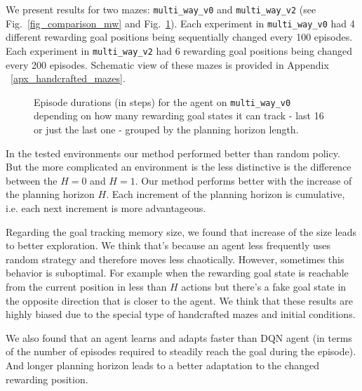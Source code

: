 \documentclass[a4paper,twoside]{article}
\begin{document}
We present results for two mazes: \texttt{multi\_way\_v0} and \texttt{multi\_way\_v2} (see Fig.~\ref{fig_comparison_mw} and Fig.~\ref{fig_detailed_mw0}). Each experiment in \texttt{multi\_way\_v0} had 4 different rewarding goal positions being sequentially changed every 100 episodes. Each experiment in \texttt{multi\_way\_v2} had 6 rewarding goal positions being changed every 200 episodes. Schematic view of these mazes is provided in Appendix ~\ref{apx_handcrafted_mazes}.

\begin{figure}
  \centering
  \begin{minipage}{\linewidth}
    
    \vspace*{10pt}

    
    \vspace*{6pt}
  \end{minipage}

  \caption{Episode durations (in steps) for the agent on \texttt{multi\_way\_v0} depending on how many rewarding goal states it can track - last 16 or just the last one - grouped by the planning horizon length.} \label{fig_detailed_mw0}
\end{figure}

In the tested environments our method performed better than random policy. But the more complicated an environment is the less distinctive is the difference between the $H = 0$ and $H = 1$. Our method performs better with the increase of the planning horizon $H$. Each increment of the planning horizon is cumulative, i.e. each next increment is more advantageous.

Regarding the goal tracking memory size, we found that increase of the size leads to better exploration. We think that's because an agent less frequently uses random strategy and therefore moves less chaotically. However, sometimes this behavior is suboptimal. For example when the rewarding goal state is reachable from the current position in less than $H$ actions but there's a fake goal state in the opposite direction that is closer to the agent. We think that these results are highly biased due to the special type of handcrafted mazes and initial conditions.
  
We also found that an agent learns and adapts faster than DQN agent (in terms of the number of episodes required to steadily reach the goal during the episode). And longer planning horizon leads to a better adaptation to the changed rewarding position.
\end{document}
